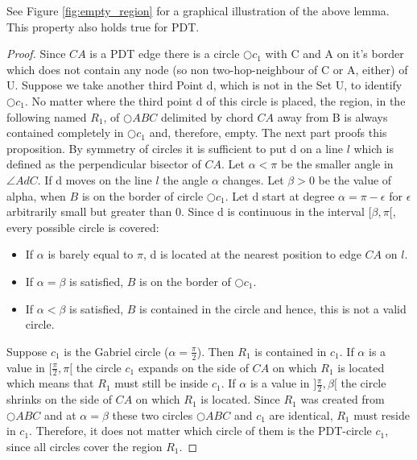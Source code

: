 See Figure \ref{fig:empty_region} for a graphical illustration of the above lemma.
This property also holds true for PDT.

\begin{proof}
Since $CA $ is a PDT edge there is a circle $\bigcirc{c_1} $ with C and A on it's border which does not contain any node (so non two-hop-neighbour of C or A, either) of U.
Suppose we take another third Point d, which is not in the Set U, to identify $\bigcirc{c_1} $.
No matter where the third point d of this circle is placed, the region, in the following named $R_1 $, of $\bigcirc{ABC} $ delimited by chord $CA $ away from B is always contained completely in $\bigcirc{c_1} $ and, therefore, empty.
The next part proofs this proposition.
By symmetry of circles it is sufficient to put d on a line  $l $ which is defined as the perpendicular bisector of $CA $.
Let $\alpha<\pi $ be the smaller angle in $\angle{AdC} $.
If d moves on the line $l $ the angle $\alpha $ changes.   
Let $\beta >0$ be the value of alpha, when $B $ is on the border of circle $\bigcirc{c_1} $.
Let d start at degree $\alpha = \pi-\epsilon $ for $\epsilon $  arbitrarily small but greater than $0 $.
Since d is continuous in the interval $[\beta,\pi[ $, every possible circle is covered:
\begin{itemize}
\item If $\alpha $ is barely equal to $\pi $, d is located at the nearest position to edge $CA $ on $l $.
\item If $\alpha=\beta $ is satisfied, $B $ is on the border of $\bigcirc{c_1} $.
\item If $\alpha <\beta $ is satisfied, $B $ is contained in the circle and hence, this is not a valid circle.
\end{itemize}
Suppose $c_1 $ is the Gabriel circle ($\alpha=\frac{\pi}{2} $).
Then $R_1 $ is contained in $c_1 $. 
If $\alpha $ is a value in $[\frac{\pi}{2},\pi[ $ the circle $c_1 $ expands on the side of $CA $ on which $R_1 $ is located which means that $R_1 $ must still be inside $c_1 $.
If $\alpha $ is a value in $]\frac{\pi}{2},\beta[ $ the circle shrinks on the side of $CA $ on which $R_1 $ is located.
Since $R_1 $ was created from $\bigcirc{ABC} $ and at $\alpha=\beta $ these two circles $\bigcirc{ABC} $ and $c_1 $ are identical, $R_1 $ must reside in $c_1 $.    
Therefore, it does not matter which circle of them is the PDT-circle $c_1 $, since all circles cover the region $R_1 $.

\end{proof} 



